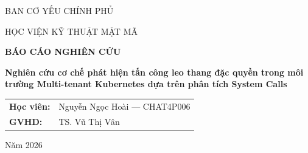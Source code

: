 \documentclass[12pt,a4paper]{article}
\begin{document}
\begin{titlepage}
\centering
{\large BAN CƠ YẾU CHÍNH PHỦ\par}
{\large HỌC VIỆN KỸ THUẬT MẬT MÃ\par}
\vspace{0.4cm}
\vfill
{\Large\bfseries BÁO CÁO NGHIÊN CỨU\par}
\vspace{0.6cm}
{\huge\bfseries Nghiên cứu cơ chế phát hiện tấn công leo thang đặc quyền trong môi trường Multi-tenant Kubernetes dựa trên phân tích System Calls\par}
\vspace{0.6cm}
\vfill
\begin{flushright}
\begin{tabular}{@{}ll@{}}
\textbf{Học viên:} & Nguyễn Ngọc Hoài — CHAT4P006 \\
\textbf{GVHD:} & TS. Vũ Thị Vân \\
\end{tabular}
\end{flushright}
\vspace{0.5cm}
{\large Năm 2026\par}
\end{titlepage}
\end{document}
